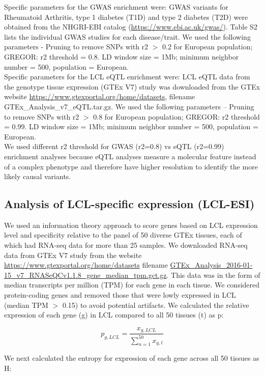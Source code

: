 Specific parameters for the GWAS enrichment were: GWAS variants for Rheumatoid Arthritis, type 1 diabetes (T1D) and type 2 diabetes (T2D) were obtained from the NHGRI-EBI catalog (\url{https://www.ebi.ac.uk/gwas/}). Table S2 lists the individual GWAS studies for each disease/trait. We used the following parameters - Pruning to remove SNPs with r2 $>$ 0.2 for European population; GREGOR: r2 threshold = 0.8. LD window size = 1Mb; minimum neighbor number = 500, population = European.\\

Specific parameters for the LCL eQTL enrichment were: LCL eQTL data from the genotype tissue expression (GTEx V7) study was downloaded from the GTEx website \url{https://www.gtexportal.org/home/datasets}, filename GTEx_Analysis_v7_eQTL.tar.gz. We used the following parameters – Pruning to remove SNPs with r2 $>$ 0.8 for European population; GREGOR: r2 threshold = 0.99. LD window size = 1Mb; minimum neighbor number = 500, population = European. \\

We used different r2 threshold for GWAS (r2=0.8) vs eQTL (r2=0.99) enrichment analyses because eQTL analyses measure a molecular feature instead of a complex phenotype and therefore have higher resolution to identify the more likely causal variants.

\subsection{Analysis of LCL-specific expression (LCL-ESI)}
We used an information theory approach \cite{schugPromoterFeaturesRelated2005, heGlobalViewEnhancer2014} to score genes based on LCL expression level and specificity relative to the panel of 50 diverse GTEx tissues, each of which had RNA-seq data for more than 25 samples. We downloaded RNA-seq data from GTEx V7 study from the website \url{https://www.gtexportal.org/home/datasets} filename \url{GTEx_Analysis_2016-01-15_v7_RNASeQCv1.1.8_gene_median_tpm.gct.gz}. This data was in the form of median transcripts per million (TPM) for each gene in each tissue. We considered protein-coding genes and removed those that were lowly expressed in LCL (median TPM $>$ 0.15) to avoid potential artifacts. We calculated the relative expression of each gene (g) in LCL compared to all 50 tissues (t) as p:

\[ p_{g,LCL} = \frac{x_{g, LCL}}{\sum_{n=1}^{50}x_{g,t}}  \]

We next calculated the entropy for expression of each gene across all 50 tissues as H:

